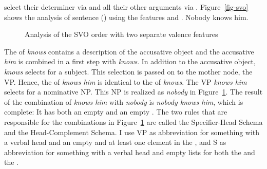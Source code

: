 select their determiner via \spr and all their other arguments via \comps. Figure~\vref{fig-svo}
shows the analysis of sentence () using the features \spr and \comps.
\ea
Nobody knows him.
\z
\begin{figure}
\caption{\label{fig-svo}Analysis of the SVO order with two separate valence features}
\end{figure}
The \compsl of \emph{knows} contains a description of the accusative object and the accusative
\emph{him} is combined in a first step with \emph{knows}. In addition to the accusative object,
\emph{knows} selects for a subject. This selection is passed on to the mother node, the VP. Hence,
the \sprv of \emph{knows him} is identical to the \sprv of \emph{knows}. The VP \emph{knows him}
selects for a nominative NP. This NP is realized as \emph{nobody} in Figure~\ref{fig-svo}. The
result of the combination of \emph{knows him} with \emph{nobody} is \emph{nobody knows him}, which
is complete: It has both an empty \sprl and an empty \compsl. The two rules that are responsible for
the combinations in Figure~\ref{fig-svo} are called the Specifier-Head Schema and the
Head-Complement Schema. I use VP as abbreviation for something with a verbal head and an empty \compsl and at least
one element in the \sprl, and S as abbreviation for something with a verbal head and empty lists for
both the \spr and the \compsv.


